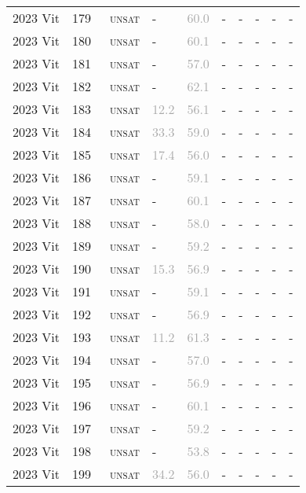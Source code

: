 \begin{center}
{\begin{longtable}{@{}llllllllll@{}}
2023 Vit & 179 & ~\textsc{unsat} & - & \textcolor{darkgray}{60.0} & - & - & - & - & - \\
2023 Vit & 180 & ~\textsc{unsat} & - & \textcolor{darkgray}{60.1} & - & - & - & - & - \\
2023 Vit & 181 & ~\textsc{unsat} & - & \textcolor{darkgray}{57.0} & - & - & - & - & - \\
2023 Vit & 182 & ~\textsc{unsat} & - & \textcolor{darkgray}{62.1} & - & - & - & - & - \\
2023 Vit & 183 & ~\textsc{unsat} & \textcolor{darkgray}{12.2} & \textcolor{darkgray}{56.1} & - & - & - & - & - \\
2023 Vit & 184 & ~\textsc{unsat} & \textcolor{darkgray}{33.3} & \textcolor{darkgray}{59.0} & - & - & - & - & - \\
2023 Vit & 185 & ~\textsc{unsat} & \textcolor{darkgray}{17.4} & \textcolor{darkgray}{56.0} & - & - & - & - & - \\
2023 Vit & 186 & ~\textsc{unsat} & - & \textcolor{darkgray}{59.1} & - & - & - & - & - \\
2023 Vit & 187 & ~\textsc{unsat} & - & \textcolor{darkgray}{60.1} & - & - & - & - & - \\
2023 Vit & 188 & ~\textsc{unsat} & - & \textcolor{darkgray}{58.0} & - & - & - & - & - \\
2023 Vit & 189 & ~\textsc{unsat} & - & \textcolor{darkgray}{59.2} & - & - & - & - & - \\
2023 Vit & 190 & ~\textsc{unsat} & \textcolor{darkgray}{15.3} & \textcolor{darkgray}{56.9} & - & - & - & - & - \\
2023 Vit & 191 & ~\textsc{unsat} & - & \textcolor{darkgray}{59.1} & - & - & - & - & - \\
2023 Vit & 192 & ~\textsc{unsat} & - & \textcolor{darkgray}{56.9} & - & - & - & - & - \\
2023 Vit & 193 & ~\textsc{unsat} & \textcolor{darkgray}{11.2} & \textcolor{darkgray}{61.3} & - & - & - & - & - \\
2023 Vit & 194 & ~\textsc{unsat} & - & \textcolor{darkgray}{57.0} & - & - & - & - & - \\
2023 Vit & 195 & ~\textsc{unsat} & - & \textcolor{darkgray}{56.9} & - & - & - & - & - \\
2023 Vit & 196 & ~\textsc{unsat} & - & \textcolor{darkgray}{60.1} & - & - & - & - & - \\
2023 Vit & 197 & ~\textsc{unsat} & - & \textcolor{darkgray}{59.2} & - & - & - & - & - \\
2023 Vit & 198 & ~\textsc{unsat} & - & \textcolor{darkgray}{53.8} & - & - & - & - & - \\
2023 Vit & 199 & ~\textsc{unsat} & \textcolor{darkgray}{34.2} & \textcolor{darkgray}{56.0} & - & - & - & - & - \\
\bottomrule
\end{longtable}
}
\end{center}



